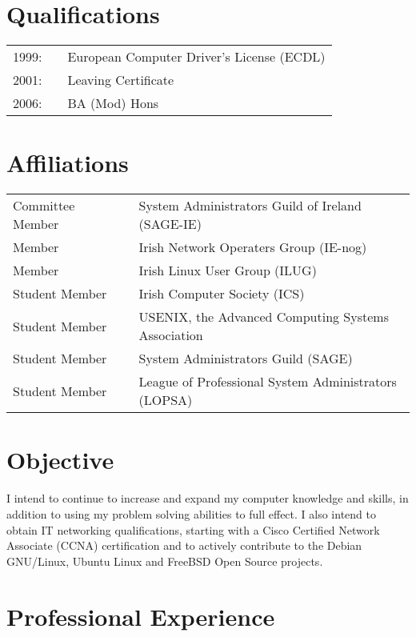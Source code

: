 \documentclass[a4paper, 11pt] {article}
\begin{document}
\section*{Qualifications}

\begin{tabular}{l l l}
1999: 	& 	&	European Computer Driver's License (ECDL) 		\\
2001:		& 	&	Leaving Certificate 										\\
2006:		& 	&	BA (Mod) Hons												\\
\end{tabular}

\section*{Affiliations}

\begin{tabular}{l l l}
Committee Member	&	&	System Administrators Guild of Ireland (SAGE-IE)	\\
Member				&	&	Irish Network Operaters Group (IE-nog)					\\
Member				&	&	Irish Linux User Group (ILUG)								\\
Student Member 	&	& 	Irish Computer Society (ICS)						\\
Student Member 	&	& 	USENIX, the Advanced Computing Systems Association\\
Student Member 	&	& 	System Administrators Guild (SAGE)						\\
Student Member 	&	& 	League of Professional System Administrators (LOPSA)\\
\end{tabular}

\section*{Objective}

I intend to continue to increase and expand my computer knowledge and
skills, in addition to using my problem solving abilities to full 
effect. I also intend to obtain IT networking qualifications, starting 
with a Cisco Certified Network Associate (CCNA) certification and to 
actively contribute to the Debian GNU/Linux, Ubuntu Linux and FreeBSD 
Open Source projects.

\section*{Professional Experience}
\end{document}
